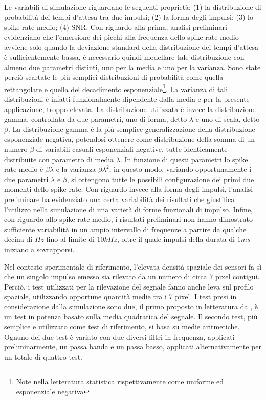 \documentclass[9pt,twocolumn,twoside]{osajnl}
\begin{document}
Le variabili di simulazione riguardano le seguenti proprietà: (1) la distribuzione di probabilità dei tempi d'attesa tra due impulsi; (2) la forma degli impulsi; (3) lo spike rate medio; (4) SNR. Con riguardo alla prima, analisi preliminari evidenziano che l'emersione dei picchi alla frequenza dello spike rate medio avviene solo quando la deviazione standard della distribuzione dei tempi d'attesa è sufficientemente bassa, è necessario quindi modellare tale distribuzione con almeno due parametri distinti, uno per la media e uno per la varianza. Sono state perciò scartate le più semplici distribuzioni di probabilità come quella rettangolare e quella del decadimento esponenziale\footnote{Note nella letteratura statistica rispettivamente come uniforme ed esponenziale negativa}. La varianza di tali distribuzioni è infatti funzionalmente dipendente dalla media e per la presente applicazione, troppo elevata. La distribuzione utilizzata è invece la distribuzione gamma, controllata da due parametri, uno di forma, detto $\lambda$ e uno di scala, detto $\beta$. La distribuzione gamma è la più semplice generalizzazione della distribuzione esponenziale negativa, potendosi ottenere come distribuzione della somma di un numero $\beta$ di variabili casuali esponenziali negative, tutte identicamente distribuite con parametro di media $\lambda$. In funzione di questi parametri lo spike rate medio è $\beta\lambda$ e la varianza $\beta\lambda^{2}$, in questo modo, variando opportunamente i due parametri $\lambda$ e $\beta$, si ottengono tutte le possibili configurazione dei primi due momenti dello spike rate. Con riguardo invece alla forma degli impulsi, l'analisi preliminare ha evidenziato una certa variabilità dei risultati che giustifica l'utilizzo nella simulazione di una varietà di forme funzionali di impulso. Infine, con riguardo allo spike rate medio, i risultati preliminari non hanno dimostrato sufficiente variabilità in un ampio intervallo di frequenze a partire da qualche decina di $Hz$ fino al limite di $10kHz$, oltre il quale impulsi della durata di $1ms$ iniziano a sovrapporsi.

Nel contesto sperimentale di riferimento, l'elevata densità spaziale dei sensori fa sì che un singolo impulso emesso sia rilevato da un numero di circa $7$ pixel contigui. Perciò, i test utilizzati per la rilevazione del segnale fanno anche leva sul profilo spaziale, utilizzando opportune quantità medie tra i 7 pixel. I test presi in considerazione dalla simulazione sono due, il primo proposto in letteratura da \cite{Lambacher2011}, è un test in potenza basato sulla media quadratica del segnale. Il secondo test, più semplice e utilizzato come test di riferimento, si basa su medie aritmetiche. Ognuno dei due test è variato con due diversi filtri in frequenza, applicati preliminarmente, un passa banda e un passa basso, applicati alternativamente per un totale di quattro test.
\end{document}

